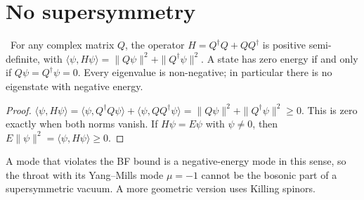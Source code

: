 \section{No supersymmetry}

\begin{theorem}\label{thm:susybps}\ver\
For any complex matrix $Q$, the operator $H=Q^\dagger Q+QQ^\dagger$ is positive semi-definite, with $\langle\psi,H\psi\rangle=\|Q\psi\|^2+\|Q^\dagger\psi\|^2$. A state has zero energy if and only if $Q\psi=Q^\dagger\psi=0$. Every eigenvalue is non-negative; in particular there is no eigenstate with negative energy.
\end{theorem}
\begin{proof}
$\langle\psi,H\psi\rangle=\langle\psi,Q^\dagger Q\psi\rangle+\langle\psi,QQ^\dagger\psi\rangle=\|Q\psi\|^2+\|Q^\dagger\psi\|^2\ge0$. This is zero exactly when both norms vanish. If $H\psi=E\psi$ with $\psi\ne0$, then $E\|\psi\|^2=\langle\psi,H\psi\rangle\ge0$.
\end{proof}


A mode that violates the BF bound is a negative-energy mode in this sense, so the throat with its Yang--Mills mode $\mu=-1$ cannot be the bosonic part of a supersymmetric vacuum. A more geometric version uses Killing spinors.

